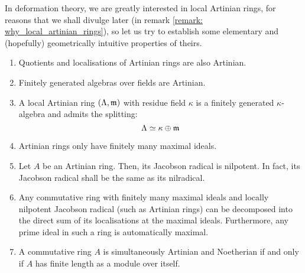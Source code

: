                 \begin{proposition} \label{prop: artinian_rings_properties}
                    In deformation theory, we are greatly interested in local Artinian rings, for reasons that we shall divulge later (in remark \ref{remark: why_local_artinian_rings}), so let us try to establish some elementary and (hopefully) geometrically intuitive properties of theirs.
                        \begin{enumerate}
                            \item Quotients and localisations of Artinian rings are also Artinian.
                            \item \cite[\href{https://stacks.math.columbia.edu/tag/00J6}{Tag 00J6}]{stacks} Finitely generated algebras over fields are Artinian.
                            \item A local Artinian ring $(\Lambda, \mathfrak{m})$ with residue field $\kappa$ is a finitely generated $\kappa$-algebra and admits the splitting:
                                $$\Lambda \simeq \kappa \oplus \mathfrak{m}$$
                            \item \cite[\href{https://stacks.math.columbia.edu/tag/00J7}{Tag 00J7}]{stacks} Artinian rings only have finitely many maximal ideals.
                            \item \cite[\href{https://stacks.math.columbia.edu/tag/00J8}{Tag 00J8}]{stacks} Let $A$ be an Artinian ring. Then, its Jacobson radical is nilpotent. In fact, its Jacobson radical shall be the same as its nilradical.
                            \item \cite[\href{https://stacks.math.columbia.edu/tag/00JA}{Tag 00JA}]{stacks} Any commutative ring with finitely many maximal ideals and locally nilpotent Jacobson radical (such as Artinian rings) can be decomposed into the direct sum of its localisations at the maximal ideals. Furthermore, any prime ideal in such a ring is automatically maximal.
                            \item \cite[\href{https://stacks.math.columbia.edu/tag/00JB}{Tag 00JB}]{stacks} A commutative ring $A$ is simultaneously Artinian and Noetherian if and only if $A$ has finite length as a module over itself. 
                        \end{enumerate}
                \end{proposition}
